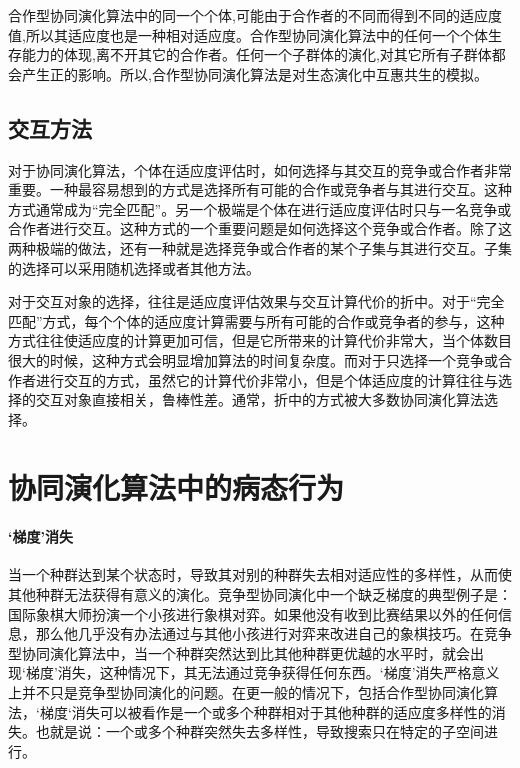 \documentclass[a4paper]{article}
\begin{document}
    合作型协同演化算法中的同一个个体,可能由于合作者的不同而得到不同的适应度值,所以其适应度也是一种相对适应度。合作型协同演化算法中的任何一个个体生存能力的体现,离不开其它的合作者。任何一个子群体的演化,对其它所有子群体都会产生正的影响。所以,合作型协同演化算法是对生态演化中互惠共生的模拟。

    \subsection{交互方法}
    
    对于协同演化算法，个体在适应度评估时，如何选择与其交互的竞争或合作者非常重要。一种最容易想到的方式是选择所有可能的合作或竞争者与其进行交互。这种方式通常成为“完全匹配”。另一个极端是个体在进行适应度评估时只与一名竞争或合作者进行交互。这种方式的一个重要问题是如何选择这个竞争或合作者。除了这两种极端的做法，还有一种就是选择竞争或合作者的某个子集与其进行交互。子集的选择可以采用随机选择或者其他方法。

    对于交互对象的选择，往往是适应度评估效果与交互计算代价的折中。对于“完全匹配”方式，每个个体的适应度计算需要与所有可能的合作或竞争者的参与，这种方式往往使适应度的计算更加可信，但是它所带来的计算代价非常大，当个体数目很大的时候，这种方式会明显增加算法的时间复杂度。而对于只选择一个竞争或合作者进行交互的方式，虽然它的计算代价非常小，但是个体适应度的计算往往与选择的交互对象直接相关，鲁棒性差。通常，折中的方式被大多数协同演化算法选择。

    \newpage
    \section{协同演化算法中的病态行为}

    \paragraph{‘梯度’消失}

    当一个种群达到某个状态时，导致其对别的种群失去相对适应性的多样性，从而使其他种群无法获得有意义的演化。竞争型协同演化中一个缺乏梯度的典型例子是：国际象棋大师扮演一个小孩进行象棋对弈。如果他没有收到比赛结果以外的任何信息，那么他几乎没有办法通过与其他小孩进行对弈来改进自己的象棋技巧。在竞争型协同演化算法中，当一个种群突然达到比其他种群更优越的水平时，就会出现‘梯度’消失，这种情况下，其无法通过竞争获得任何东西。‘梯度’消失严格意义上并不只是竞争型协同演化的问题。在更一般的情况下，包括合作型协同演化算法，‘梯度‘消失可以被看作是一个或多个种群相对于其他种群的适应度多样性的消失。也就是说：一个或多个种群突然失去多样性，导致搜索只在特定的子空间进行。
\end{document}
